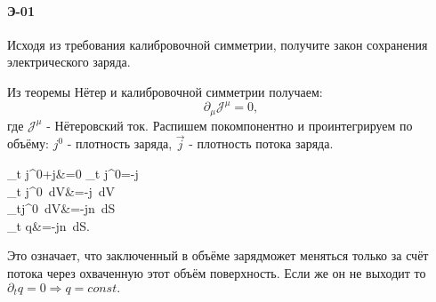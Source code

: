 


	\paragraph{Э-01}
	Исходя из требования калибровочной симметрии, получите закон сохранения электрического заряда.
	
	Из теоремы Нётер и калибровочной симметрии получаем:
	$$
	\partial_\mu\mathcal{J}^\mu = 0 ,
	$$
	где $\mathcal{J}^\mu$ - Нётеровский ток. Распишем покомпонентно и проинтегрируем по объёму:
	$j^0$ - плотность заряда, $\vec j$ - плотность потока заряда.
	\begin{flalign*}
	\partial_t j^0+\nabla\vec j&=0
	\Rightarrow
	\partial_t j^0=-\nabla\vec j
	\Rightarrow\\
	\int\partial_t j^0~dV&=-\int\nabla\vec j~dV
	\Rightarrow\\
	\partial_t\int j^0~dV&=-\oint\vec j\vec n~dS
	\Rightarrow\\
	\partial_t q&=-\oint\vec j\vec n~dS.
	\end{flalign*}
	
	Это означает, что заключенный в объёме зарядможет меняться только за счёт потока через охваченную этот объём поверхность. Если же он не выходит то $\partial_t q=0 \Rightarrow q=const.$
